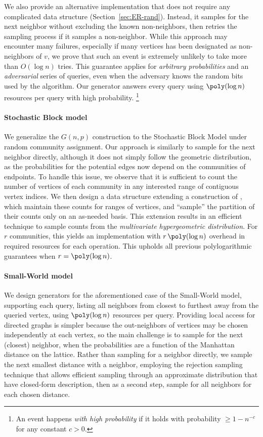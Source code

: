 We also provide an alternative implementation that does not require any complicated data structure (Section~\ref{sec:ER-rand}).
Instead, it samples for the next neighbor without excluding the known non-neighbors,
then retries the sampling process if it samples a non-neighbor.
While this approach may encounter many failures, especially if many vertices has been designated as non-neighbors of $v$,
we prove that such an event is extremely unlikely to take more than $O(\log n)$ tries.
This guarantee applies for \emph{arbitrary probabilities} and an
\emph{adversarial} series of queries,
even when the adversary knows the random bits used by the algorithm.
Our generator answers every query using $\poly(\log n)$ resources per query with high probability.
\footnote{An event happens \emph{with high probability} if it holds with probability $\ge 1-n^{-c}$ for any constant $c > 0$.}

\paragraph{Stochastic Block model}
We generalize the $G(n,p)$ construction to the Stochastic Block Model under random community assignment.
Our approach is similarly to sample for the next neighbor directly,
although it does not simply follow the geometric distribution,
as the probabilities for the potential edges now depend on the communities of endpoints.
To handle this issue, we observe that it is sufficient to count
the number of vertices of each community in any interested range of contiguous vertex indices.
We then design a data structure extending a construction of \cite{huge},
which maintain these counts for ranges of vertices, and ``sample'' the partition of their counts only on an as-needed basis.
This extension results in an efficient technique  to sample counts from the \emph{multivariate hypergeometric distribution}.
For $r$ communities, this yields an implementation with $r\,\poly(\log n)$ overhead in required resources for each operation.
This upholds all previous polylogarithmic guarantees when $r = \poly(\log n)$.

\paragraph{Small-World model} 
We design generators for the aforementioned case of the Small-World model, supporting each  query, listing all neighbors from closest to furthest away from the queried vertex, using $\poly(\log n)$ resources per query. Providing local access for directed graphs is simpler because the out-neighbors of vertices may be chosen independently at each vertex, so the main challenge is to sample for the next (closest) neighbor, when the probabilities are a function of the Manhattan distance on the lattice. Rather than sampling for a neighbor directly, we sample the next smallest distance with a neighbor, employing the rejection sampling technique that allows efficient sampling through an approximate distribution that have closed-form description, then as a second step, sample for all neighbors for each chosen distance.


